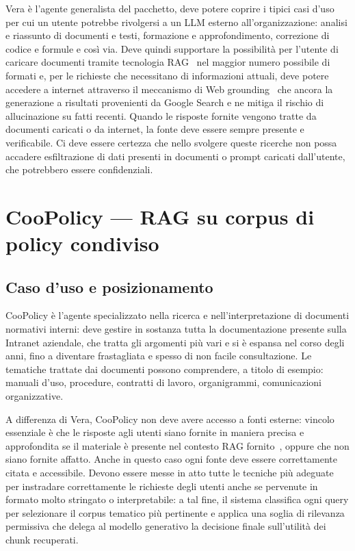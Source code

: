 Vera è l'agente generalista del pacchetto, deve potere coprire i tipici casi d'uso per cui un utente 
potrebbe rivolgersi a un LLM esterno all'organizzazione:
analisi e riassunto di documenti e testi, formazione e approfondimento, correzione di codice e formule e così via.
Deve quindi supportare la possibilità per l'utente di caricare documenti tramite tecnologia RAG~\cite{lewis2020rag} 
nel maggior numero possibile di formati e, per le richieste che necessitano di informazioni attuali, deve potere accedere
a internet attraverso il meccanismo di Web grounding~\cite{gcp_grounding} che ancora la generazione a 
risultati provenienti da Google Search e ne mitiga il rischio di allucinazione su fatti recenti. 
Quando le risposte fornite vengono tratte da documenti caricati o da internet, la fonte deve essere sempre presente e verificabile.
Ci deve essere certezza che nello svolgere queste ricerche non possa accadere esfiltrazione 
di dati presenti in documenti o prompt caricati dall'utente, che potrebbero essere confidenziali.

\section{CooPolicy --- RAG su corpus di policy condiviso}
\label{sec:agenti-coopolicy-arch}

\subsection{Caso d'uso e posizionamento}
\label{subsec:coopolicy-caso-uso}

CooPolicy è l'agente specializzato nella ricerca e nell'interpretazione di documenti normativi interni: 
deve gestire in sostanza tutta la documentazione presente sulla Intranet aziendale,
che tratta gli argomenti più vari e si è espansa nel corso degli anni, fino a diventare frastagliata 
e spesso di non facile consultazione.
Le tematiche trattate dai documenti possono comprendere, a titolo di esempio: 
manuali d'uso, procedure, contratti di lavoro, organigrammi, comunicazioni organizzative.

A differenza di Vera, CooPolicy non deve avere accesso a fonti esterne: vincolo essenziale è che le 
risposte agli utenti siano fornite in maniera precisa e approfondita se il materiale è presente nel
contesto RAG fornito~\cite{lewis2020rag,guu2020realm}, oppure che non siano fornite affatto.
Anche in questo caso ogni fonte deve essere correttamente citata e accessibile.
Devono essere messe in atto tutte le tecniche più adeguate per instradare correttamente le 
richieste degli utenti anche se pervenute in formato molto stringato o interpretabile: a tal fine, il sistema 
classifica ogni query per selezionare il corpus tematico più pertinente e applica una soglia di 
rilevanza permissiva che delega al modello generativo la decisione finale sull'utilità dei chunk recuperati.

